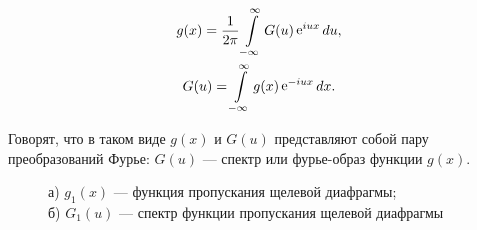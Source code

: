 \documentclass[a5paper,10pt, twoside]{article} %
\begin{document}
	\begin{equation}
		\begin{gathered} 
			g(x) = \frac{1}{2\pi} \int\limits_{-\infty}^{\infty} G(u) \mathop{\mathrm e}\nolimits^{iux} du,\\
			G(u) = \int\limits_{-\infty}^{\infty} g(x) \mathop{\mathrm e}\nolimits^{-iux} dx.
		 \end{gathered}
	\end{equation}
	
	Говорят, что в таком виде $g(x)$ и $G(u)$ представляют собой пару преобразований Фурье: 
	$G(u)$ — спектр или фурье-образ функции $g(x)$.
	
	\begin{figure}[h]
		\begin{minipage}[h]{0.4\linewidth}
		\end{minipage}
		\hfill
		\begin{minipage}[h]{0.6\linewidth}
		\end{minipage}
		\caption
		{
			а) $g_1 (x)$ — функция пропускания щелевой диафрагмы; \\
			б) $G_1 (u)$ — спектр функции пропускания щелевой диафрагмы
		}
		\label{ris:dia}
	\end{figure}
	
\end{document}
